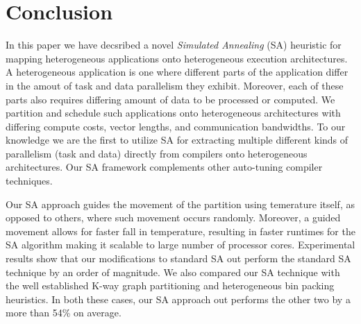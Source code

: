 \documentclass[10pt, conference, compsocconf]{IEEEtran}
\begin{document}




\section{Conclusion}
\label{sec:conclusion}

In this paper we have decsribed a novel \textit{Simulated Annealing}
(SA) heuristic for mapping heterogeneous applications onto heterogeneous
execution architectures. A heterogeneous application is one where
different parts of the application differ in the amout of task and data
parallelism they exhibit. Moreover, each of these parts also requires
differing amount of data to be processed or computed. We partition and
schedule such applications onto heterogeneous architectures with
differing compute costs, vector lengths, and communication
bandwidths. To our knowledge we are the first to utilize SA for
extracting multiple different kinds of parallelism (task and data)
directly from compilers onto heterogeneous architectures. Our SA
framework complements other auto-tuning compiler techniques.

Our SA approach guides the movement of the partition using temerature
itself, as opposed to others, where such movement occurs
randomly. Moreover, a guided movement allows for faster fall in
temperature, resulting in faster runtimes for the SA algorithm making it
scalable to large number of processor cores. Experimental results show
that our modifications to standard SA out perform the standard SA
technique by an order of magnitude. We also compared our SA technique
with the well established K-way graph partitioning and heterogeneous bin
packing heuristics. In both these cases, our SA approach out performs
the other two by a more than 54\% on average.





\scriptsize{

% 

}

\end{document}
